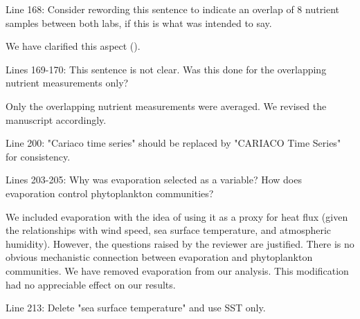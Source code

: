 \documentclass[12pt,english]{reviewresponse}
\begin{document}
\begin{revcomment}
Line 168: Consider rewording this sentence to indicate an overlap of 8 nutrient samples between both labs, if this is what was intended to say.
\end{revcomment}
\begin{revresponse}
	We have clarified this aspect ().
\end{revresponse}

\begin{revcomment}
Lines 169-170: This sentence is not clear. Was this done for the overlapping nutrient measurements only?
\end{revcomment}
\begin{revresponse}
	Only the overlapping nutrient measurements were averaged. We revised the manuscript accordingly.
\end{revresponse}

\begin{revcomment}
Line 200: "Cariaco time series" should be replaced by "CARIACO Time Series" for consistency.
\end{revcomment}
\begin{revresponse}
\end{revresponse}

\begin{revcomment}
Lines 203-205: Why was evaporation selected as a variable? How does evaporation control phytoplankton communities?
\end{revcomment}
\begin{revresponse}
	We included evaporation with the idea of using it as a proxy for heat flux (given the relationships with wind speed, sea surface temperature, and atmospheric humidity). However, the questions raised by the reviewer are justified. There is no obvious mechanistic connection between evaporation and phytoplankton communities. We have removed evaporation from our analysis. This modification had no appreciable effect on our results.
\end{revresponse}

\begin{revcomment}
Line 213: Delete "sea surface temperature" and use SST only.
\end{revcomment}
\begin{revresponse}
\end{revresponse}
\end{document}

